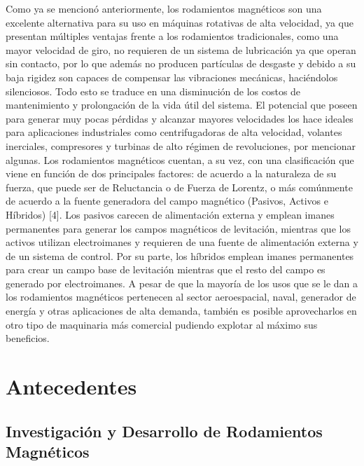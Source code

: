 Como ya se mencionó anteriormente, los rodamientos magnéticos son una excelente alternativa para su uso en máquinas rotativas de alta velocidad, ya que presentan múltiples ventajas frente a los rodamientos tradicionales, como una mayor velocidad de giro, no requieren de un sistema de lubricación ya que operan sin contacto, por lo que además no producen partículas de desgaste y debido a su baja rigidez son capaces de compensar las vibraciones mecánicas, haciéndolos silenciosos. Todo esto se traduce en una disminución de los costos de mantenimiento y prolongación de la vida útil del sistema. 
El potencial que poseen para generar muy pocas pérdidas y alcanzar mayores velocidades los hace ideales para aplicaciones industriales como centrifugadoras de alta velocidad, volantes inerciales, compresores y turbinas de alto régimen de revoluciones, por mencionar algunas. 
Los rodamientos magnéticos cuentan, a su vez, con una clasificación que viene en función de dos principales factores: de acuerdo a la naturaleza de su fuerza, que puede ser de Reluctancia o de Fuerza de Lorentz, o más comúnmente de acuerdo a la fuente generadora del campo magnético (Pasivos, Activos e Híbridos) [4]. 
Los pasivos carecen de alimentación externa y emplean imanes permanentes para generar los campos magnéticos de levitación, mientras que los activos utilizan electroimanes y requieren de una fuente de alimentación externa y de un sistema de control. Por su parte, los híbridos emplean imanes permanentes para crear un campo base de levitación mientras que el resto del campo es generado por electroimanes.
A pesar de que la mayoría de los usos que se le dan a los rodamientos magnéticos pertenecen al sector aeroespacial, naval, generador de energía y otras aplicaciones de alta demanda, también es posible aprovecharlos en otro tipo de maquinaria más comercial pudiendo explotar al máximo sus beneficios. 


\section*{Antecedentes}
\subsection*{Investigación y Desarrollo de Rodamientos Magnéticos}
\label{sec:intro:results}

